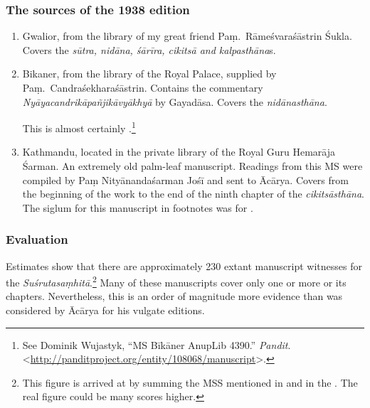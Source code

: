 \subsubsection{The sources of the 1938 edition}
\begin{enumerate}
    \item [1]  Gwalior, from the library of my great friend Paṃ.\ Rāmeśvaraśāstrin 
    Śukla. 
    Covers the \emph{sūtra, nidāna, śārīra, cikitsā and kalpasthāna}s.
    
   \item[2] Bikaner, from the library of the Royal Palace, supplied by Paṃ.\ 
Candraśekharaśāstrin. Contains the commentary 
\emph{Nyāyacandrikāpañjikāvyākhyā} by Gayadāsa.  Covers the 
\emph{nidānasthāna}.  

This is almost certainly .\footnote{See Dominik Wujastyk, “MS Bīkāner AnupLib 4390.” 
\emph{Pandit}. 
<\url{http://panditproject.org/entity/108068/manuscript}>.}

\item [3] Kathmandu, located in the private library of the Royal Guru Hemarāja 
Śarman.  An extremely old palm-leaf manuscript. Readings from this MS were 
compiled by Paṃ Nityānandaśarman Jośī and sent to Ācārya. Covers from the 
beginning of the work to the end of the ninth chapter of the 
\emph{cikitsāsthāna}.  The 
siglum for this manuscript in footnotes was  for 
. 
\end{enumerate}
\subsubsection{Evaluation}

Estimates show that there are approximately 230 extant manuscript
witnesses for the \emph{Suśrutasaṃhitā}.\footnote{This figure is arrived
at by summing the MSS mentioned in \cite{ncc} and in the \cite{ngmcp}. The
real figure could be many scores higher.}  Many of these manuscripts cover only
one or more or its chapters.  Nevertheless, this is an order of magnitude
more evidence than was considered by Ācārya for his vulgate editions.

